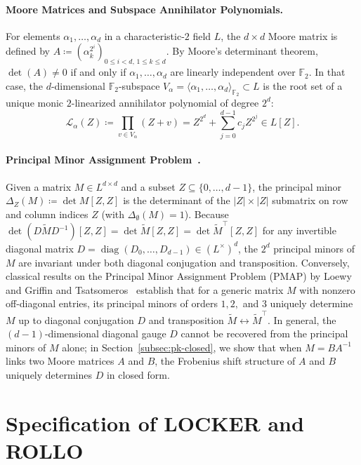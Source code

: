 \documentclass[11pt,a4paper]{article}
\theoremstyle{definition}
\theoremstyle{remark}
\newcommand{\Ftwo}{\mathbb{F}_2}
\newcommand{\diag}{\operatorname{diag}}
\begin{document}
\paragraph{Moore Matrices and Subspace Annihilator Polynomials.}
For elements $\alpha_1, \dots, \alpha_d$ in a characteristic-$2$ field $L$, the $d \times d$ Moore matrix is defined by $A \coloneqq (\alpha_k^{2^i})_{0 \le i < d,\, 1 \le k \le d}$. By Moore's determinant theorem, $\det(A) \neq 0$ if and only if $\alpha_1, \dots, \alpha_d$ are linearly independent over $\Ftwo$. In that case, the $d$-dimensional $\Ftwo$-subspace $V_\alpha = \langle \alpha_1, \dots, \alpha_d \rangle_{\Ftwo} \subset L$ is the root set of a unique monic $2$-linearized annihilator polynomial of degree $2^d$:
\[
    \mathcal{L}_\alpha(Z) \coloneqq \prod_{v \in V_\alpha} (Z + v) = Z^{2^d} + \sum_{j=0}^{d-1} c_j Z^{2^j} \in L[Z].
\]

\paragraph{Principal Minor Assignment Problem~\cite{Loewy86,GT06}.}
Given a matrix $M \in L^{d \times d}$ and a subset $Z \subseteq \{0, \dots, d-1\}$, the principal minor $\Delta_Z(M) \coloneqq \det M[Z, Z]$ is the determinant of the $|Z| \times |Z|$ submatrix on row and column indices $Z$ (with $\Delta_\emptyset(M) = 1$). Because $\det(D \tilde{M} D^{-1})[Z, Z] = \det \tilde{M}[Z, Z] = \det \tilde{M}^\top[Z, Z]$ for any invertible diagonal matrix $D = \diag(D_0, \dots, D_{d-1}) \in (L^\times)^d$, the $2^d$ principal minors of $M$ are invariant under both diagonal conjugation and transposition. Conversely, classical results on the Principal Minor Assignment Problem (PMAP) by Loewy~\cite{Loewy86} and Griffin and Tsatsomeros~\cite{GT06} establish that for a generic matrix $M$ with nonzero off-diagonal entries, its principal minors of orders $1, 2,$ and $3$ uniquely determine $M$ up to diagonal conjugation $D$ and transposition $\tilde{M} \leftrightarrow \tilde{M}^\top$. In general, the $(d-1)$-dimensional diagonal gauge $D$ cannot be recovered from the principal minors of $M$ alone; in Section~\ref{subsec:pk-closed}, we show that when $M = B A^{-1}$ links two Moore matrices $A$ and $B$, the Frobenius shift structure of $A$ and $B$ uniquely determines $D$ in closed form.

\section{Specification of LOCKER and ROLLO}
\label{sec:spec}
\end{document}
